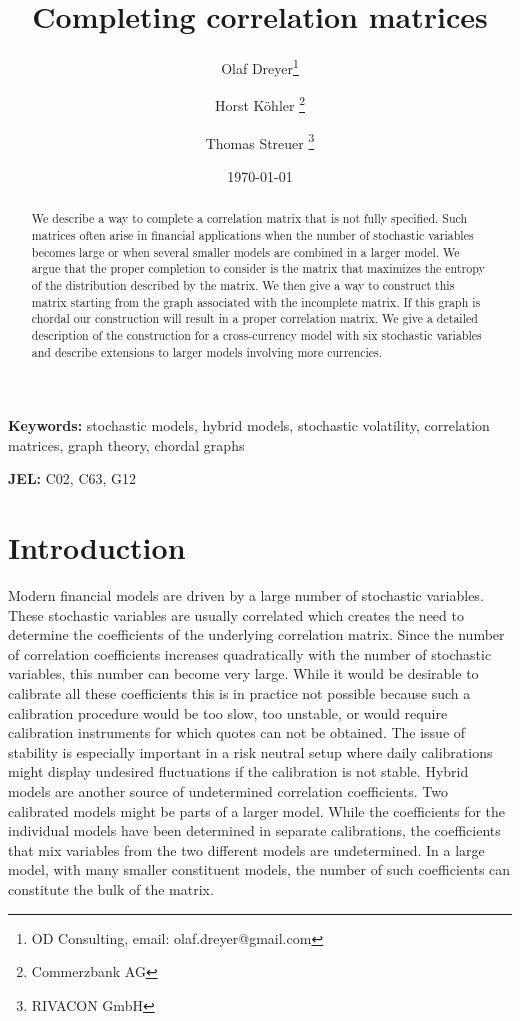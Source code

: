 \documentclass[11pt, a4paper]{article}
\begin{document}
\title{Completing correlation matrices}

\author{Olaf Dreyer\thanks{OD Consulting, email: olaf.dreyer@gmail.com}
\and Horst K\"ohler \thanks{Commerzbank AG}
\and Thomas Streuer \thanks{RIVACON GmbH} }

\date{\today}

\maketitle

\begin{abstract}
	We describe a way to complete a correlation matrix that is not fully specified. Such matrices often arise in financial applications when the number of stochastic variables becomes large or when several smaller models are combined in a larger model. We argue that the proper completion to consider is the matrix that maximizes the entropy of the distribution described by the matrix. We then give a way to construct this matrix starting from the graph associated with the incomplete matrix. If this graph is chordal our construction will result in a proper correlation matrix. We give a detailed description of the construction for a cross-currency model with six stochastic variables and describe extensions to larger models involving more currencies.
\end{abstract}

\textbf{Keywords:} stochastic models, hybrid models, stochastic volatility, correlation matrices, graph theory, chordal graphs

\textbf{JEL:} C02, C63, G12

\section{Introduction}
Modern financial models are driven by a large number of stochastic variables. These stochastic variables are usually correlated which creates the need to determine the coefficients of the underlying correlation matrix. Since the number of correlation coefficients increases quadratically with the number of stochastic variables, this number can become very large. While it would be desirable to calibrate all these coefficients this is in practice not possible because such a calibration procedure would be too slow, too unstable, or would require calibration instruments for which quotes can not be obtained. The issue of stability is especially important in a risk neutral setup where daily calibrations might display undesired fluctuations if the calibration is not stable. Hybrid models are another source of undetermined correlation coefficients. Two calibrated models might be parts of a larger model. While the coefficients for the individual models have been determined in separate calibrations, the coefficients that mix variables from the two different models are undetermined. In a large model, with many smaller constituent models, the number of such coefficients can constitute the bulk of the matrix. 
\end{document}

